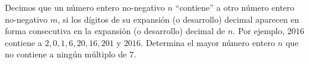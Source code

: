 Decimos que un número entero no-negativo $n$ “contiene” a otro número entero no-negativo
$m$, si los dígitos de su expansión (o desarrollo) decimal aparecen en forma consecutiva en
la expansión (o desarrollo) decimal de $n$. Por ejemplo, $2016$ contiene a $2,0,1,6, 20, 16, 201$
y $2016$. Determina el mayor número entero $n$ que no contiene a ningún múltiplo de $7$.